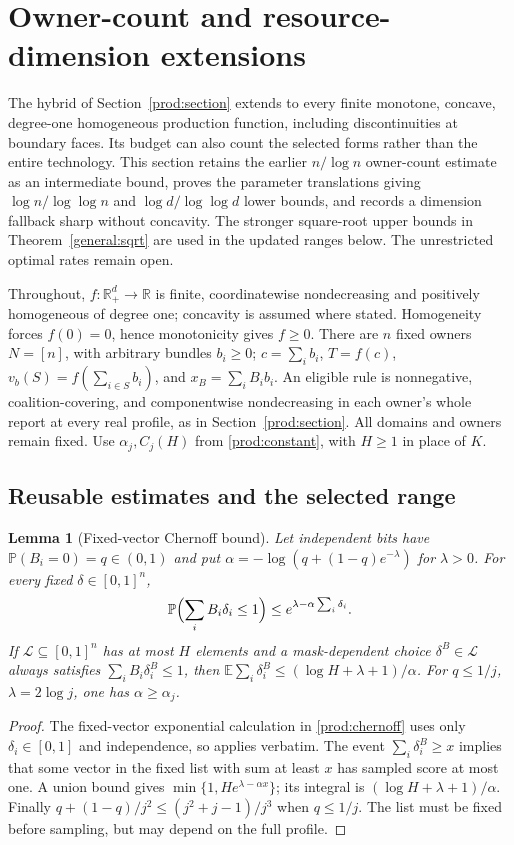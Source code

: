 \documentclass[11pt]{article}
\newtheorem{lemma}[theorem]{Lemma}
\theoremstyle{definition}\newtheorem{definition}[theorem]{Definition}
\theoremstyle{remark}\newtheorem{remark}[theorem]{Remark}
\newcommand{\R}{\mathbb R}
\newcommand{\E}{\mathbb E}
\newcommand{\Prob}{\mathbb P}
\begin{document}
\section{Owner-count and resource-dimension extensions}\label{ext:sec}
The hybrid of Section~\ref{prod:section} extends to every finite monotone,
concave, degree-one homogeneous production function, including discontinuities
at boundary faces.  Its budget can also count the selected forms rather than
the entire technology. This section retains the earlier $n/\log n$
owner-count estimate as an intermediate bound, proves the parameter
translations giving $\log n/\log\log n$ and $\log d/\log\log d$ lower bounds,
and records a dimension fallback sharp without concavity. The stronger
square-root upper bounds in Theorem~\ref{general:sqrt} are used in the
updated ranges below. The unrestricted optimal rates remain open.

Throughout, $f:\R_+^d\to\R$ is finite, coordinatewise nondecreasing and
positively homogeneous of degree one; concavity is assumed where stated.
Homogeneity forces $f(0)=0$, hence monotonicity gives $f\ge0$.
There are $n$ fixed owners $N=[n]$, with arbitrary bundles $b_i\ge0$;
$c=\sum_i b_i$, $T=f(c)$, $v_b(S)=f(\sum_{i\in S}b_i)$, and
$x_B=\sum_iB_i b_i$.  An eligible rule is nonnegative, coalition-covering,
and componentwise nondecreasing in each owner's whole report at every real
profile, as in Section~\ref{prod:section}.  All domains and owners remain fixed.
Use $\alpha_j,C_j(H)$ from \eqref{prod:constant}, with $H\ge1$ in place of $K$.

\subsection{Reusable estimates and the selected range}
\begin{lemma}[Fixed-vector Chernoff bound]\label{ext:lem:chernoff}
Let independent bits have $\Prob(B_i=0)=q\in(0,1)$ and put
$\alpha=-\log(q+(1-q)e^{-\lambda})$ for $\lambda>0$.
For every fixed $\delta\in[0,1]^n$,
\[
 \Prob\Bigl(\sum_iB_i\delta_i\le1\Bigr)
 \le e^{\lambda-\alpha\sum_i\delta_i}.
\]
If $\mathcal L\subseteq[0,1]^n$ has at most $H$ elements and a mask-dependent
choice $\delta^B\in\mathcal L$ always satisfies
$\sum_iB_i\delta_i^B\le1$, then
$\E\sum_i\delta_i^B\le(\log H+\lambda+1)/\alpha$.
For $q\le1/j$, $\lambda=2\log j$, one has $\alpha\ge\alpha_j$.
\end{lemma}
\begin{proof}
The fixed-vector exponential calculation in \eqref{prod:chernoff} uses only
$\delta_i\in[0,1]$ and independence, so applies verbatim.
The event $\sum_i\delta_i^B\ge x$ implies that some vector in the fixed
list with sum at least $x$ has sampled score at most one.
A union bound gives $\min\{1,He^{\lambda-\alpha x}\}$; its integral is
$(\log H+\lambda+1)/\alpha$.  Finally
$q+(1-q)/j^2\le(j^2+j-1)/j^3$ when $q\le1/j$.
The list must be fixed before sampling, but may depend on the full profile.
\end{proof}
\end{document}

